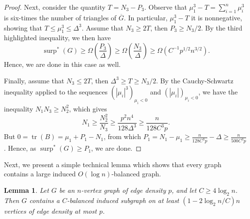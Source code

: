 \documentclass[11pt]{article}
\theoremstyle{plain}
\newtheorem{lemma}[theorem]{Lemma}
\theoremstyle{definition}
\DeclareMathOperator{\surp}{surp}
\DeclareMathOperator{\trace}{tr}
\begin{document}
\begin{proof}
Next, consider the quantity $T=N_3-P_3$. Observe that $\mu_1^3-T=\sum_{i=1}^n\mu_i^3$ is six-times the number of triangles of $\overline{G}$. In particular, $\mu_1^3-T$ it is nonnegative, showing that $T\leq \mu_1^3\leq \Delta^3$. Assume that $N_3\geq 2T$, then $P_3\geq N_3/2$. By the third highlighted inequality, we then have $$\surp^*(G)\geq \Omega\left(\frac{P_3}{\Delta}\right)\geq \Omega\left(\frac{N_3}{\Delta}\right)\geq \Omega(C^{-1}p^{1/2}n^{3/2}).$$
Hence, we are done in this case as well.

Finally, assume that $N_3\leq 2T$, then $\Delta^3\geq T\geq N_3/2$. By the Cauchy-Schwartz inequality applied to the sequences $(|\mu_i|^3)_{\mu_i<0}$ and $(|\mu_i|)_{\mu_i<0}$, we have the inequality $N_1N_3\geq N_2^2$, which gives 
$$N_1\geq \frac{N_2^2}{N_3}\geq \frac{p^2n^4}{128\Delta^3}\geq \frac{n}{128C^3p}.$$
But $0=\trace(B)=\mu_1+P_1-N_1$, from which $P_1=N_1-\mu_1\geq \frac{n}{128C^3p}-\Delta\geq \frac{n}{500C^3p}$. Hence, as $\surp^*(G)\geq P_1$, we are done. 
\end{proof}

Next, we present a simple technical lemma which shows that every graph contains a large induced $O(\log n)$-balanced graph.

\begin{lemma}\label{lemma:balanced}
Let $G$ be an $n$-vertex graph of edge density $p$, and let $C\geq 4\log_2 n$. Then $G$ contains a $C$-balanced induced subgraph on at least $(1-2\log_2 n/C)n$ vertices of edge density at most $p$.
\end{lemma}
\end{document}

